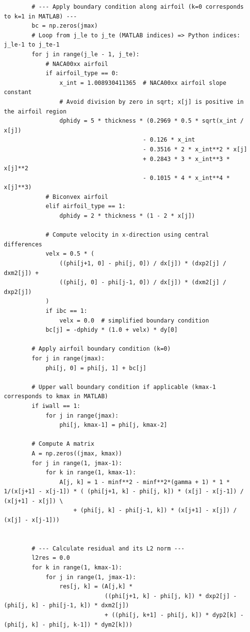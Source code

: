 \documentclass[12pt]{article}
\theoremstyle{definition}
\begin{document}
\begin{verbatim}
        # --- Apply boundary condition along airfoil (k=0 corresponds to k=1 in MATLAB) ---
        bc = np.zeros(jmax)
        # Loop from j_le to j_te (MATLAB indices) => Python indices: j_le-1 to j_te-1
        for j in range(j_le - 1, j_te):
            # NACA00xx airfoil
            if airfoil_type == 0:
                x_int = 1.008930411365  # NACA00xx airfoil slope constant
                # Avoid division by zero in sqrt; x[j] is positive in the airfoil region
                dphidy = 5 * thickness * (0.2969 * 0.5 * sqrt(x_int / x[j])
                                        - 0.126 * x_int
                                        - 0.3516 * 2 * x_int**2 * x[j]
                                        + 0.2843 * 3 * x_int**3 * x[j]**2
                                        - 0.1015 * 4 * x_int**4 * x[j]**3)
            # Biconvex airfoil
            elif airfoil_type == 1:
                dphidy = 2 * thickness * (1 - 2 * x[j])

            # Compute velocity in x-direction using central differences
            velx = 0.5 * (
                ((phi[j+1, 0] - phi[j, 0]) / dx[j]) * (dxp2[j] / dxm2[j]) +
                ((phi[j, 0] - phi[j-1, 0]) / dx[j]) * (dxm2[j] / dxp2[j])
            )
            if ibc == 1:
                velx = 0.0  # simplified boundary condition
            bc[j] = -dphidy * (1.0 + velx) * dy[0]

        # Apply airfoil boundary condition (k=0)
        for j in range(jmax):
            phi[j, 0] = phi[j, 1] + bc[j]

        # Upper wall boundary condition if applicable (kmax-1 corresponds to kmax in MATLAB)
        if iwall == 1:
            for j in range(jmax):
                phi[j, kmax-1] = phi[j, kmax-2]

        # Compute A matrix
        A = np.zeros((jmax, kmax))
        for j in range(1, jmax-1):
            for k in range(1, kmax-1):
                A[j, k] = 1 - minf**2 - minf**2*(gamma + 1) * 1 * 1/(x[j+1] - x[j-1]) * ( (phi[j+1, k] - phi[j, k]) * (x[j] - x[j-1]) / (x[j+1] - x[j]) \
                    + (phi[j, k] - phi[j-1, k]) * (x[j+1] - x[j]) / (x[j] - x[j-1]))

                
        # --- Calculate residual and its L2 norm ---
        l2res = 0.0
        for k in range(1, kmax-1):
            for j in range(1, jmax-1):
                res[j, k] = (A[j,k] *
                             ((phi[j+1, k] - phi[j, k]) * dxp2[j] - (phi[j, k] - phi[j-1, k]) * dxm2[j])
                             + ((phi[j, k+1] - phi[j, k]) * dyp2[k] - (phi[j, k] - phi[j, k-1]) * dym2[k]))
                

\end{verbatim}
\end{document}
